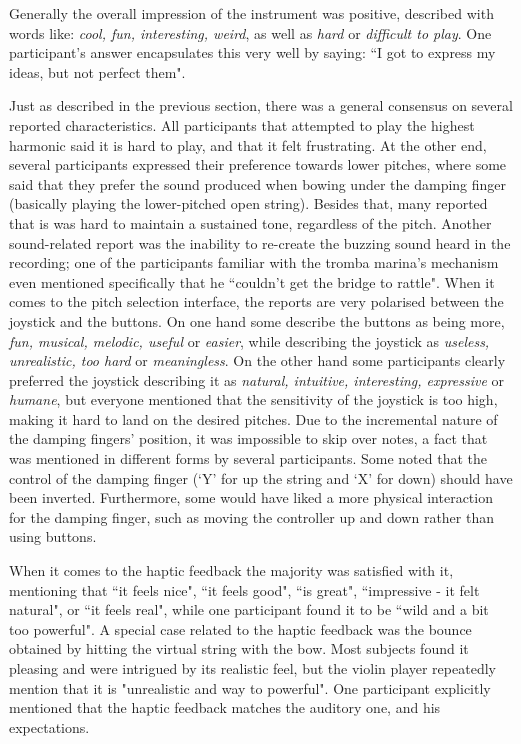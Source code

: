 \documentclass[dvipsnames, pdftex]{article}
\begin{document}
Generally the overall impression of the instrument was positive, described with words like: \textit{cool, fun, interesting, weird}, as well as \textit{hard} or \textit{difficult to play}. One participant's answer encapsulates this very well by saying: ``I got to express my ideas, but not perfect them". 

Just as described in the previous section, there was a general consensus on several reported characteristics. All participants that attempted to play the highest harmonic said it is hard to play, and that it felt frustrating. At the other end, several participants expressed their preference towards lower pitches, where some said that they prefer the sound produced when bowing under the damping finger (basically playing the lower-pitched open string). Besides that, many reported that is was hard to maintain a sustained tone, regardless of the pitch. Another sound-related report was the inability to re-create the buzzing sound heard in the recording; one of the participants familiar with the tromba marina's mechanism even mentioned specifically that he ``couldn't get the bridge to rattle". When it comes to the pitch selection interface, the reports are very polarised between the joystick and the buttons. On one hand some describe the buttons as being more, \textit{fun, musical, melodic, useful} or \textit{easier}, while describing the joystick as \textit{useless, unrealistic, too hard} or \textit{meaningless}. On the other hand some participants clearly preferred the joystick describing it as \textit{natural, intuitive, interesting, expressive} or \textit{humane}, but everyone mentioned that the sensitivity of the joystick is too high, making it hard to land on the desired pitches. Due to the incremental nature of the damping fingers' position, it was impossible to skip over notes, a fact that was mentioned in different forms by several participants. Some noted that the control of the damping finger (`Y' for up the string and `X' for down) should have been inverted. Furthermore, some would have liked a more physical interaction for the damping finger, such as moving the controller up and down rather than using buttons.

When it comes to the haptic feedback the majority was satisfied with it, mentioning that ``it feels nice", ``it feels good", ``is great", ``impressive - it felt natural", or ``it feels real", while one participant found it to be ``wild and a bit too powerful". A special case related to the haptic feedback was the bounce obtained by hitting the virtual string with the bow. Most subjects found it pleasing and were intrigued by its realistic feel, but the violin player repeatedly mention that it is "unrealistic and way to powerful". One participant explicitly mentioned that the haptic feedback matches the auditory one, and his expectations.
\end{document}
